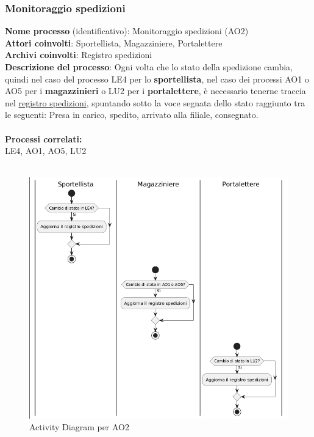 \documentclass[a4paper,12pt]{article}
\begin{document}
\subsubsection{Monitoraggio spedizioni}
\textbf{Nome processo} (identificativo): Monitoraggio spedizioni (AO2)\\
\textbf{Attori coinvolti}: Sportellista, Magazziniere, Portalettere \\
\textbf{Archivi coinvolti}: Registro spedizioni \\
\textbf{Descrizione del processo}: Ogni volta che lo stato della spedizione cambia, quindi nel caso del processo LE4 per lo \textbf{sportellista},
nel caso dei processi AO1 o AO5 per i \textbf{magazzinieri} o LU2 per i \textbf{portalettere}, è necessario tenerne traccia nel 
\underline{registro spedizioni}, spuntando sotto la voce segnata dello stato raggiunto tra le seguenti: Presa in carico, spedito, arrivato alla filiale, consegnato. \\ \\
\textbf{Processi correlati:}\\LE4, AO1, AO5, LU2\\ \\
\begin{figure}[H]
  \centering
  \includegraphics[width=0.8\linewidth]{assets/activitydiagram_AO2.png}
	\caption{Activity Diagram per AO2}
\end{figure}
\end{document}
